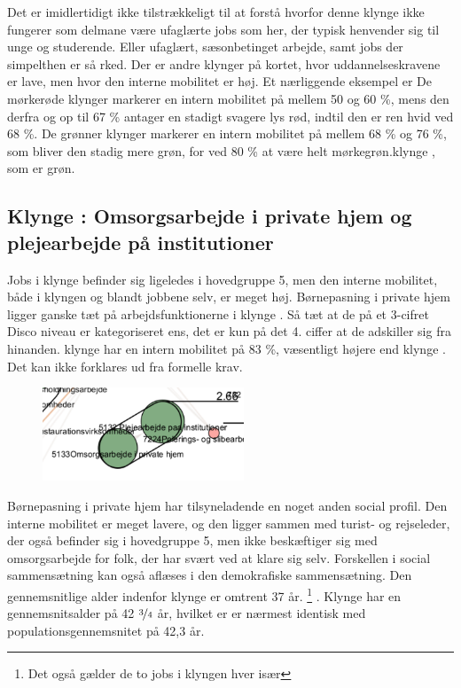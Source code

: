 Det er imidlertidigt ikke tilstrækkeligt til at forstå hvorfor denne klynge ikke fungerer som delmane være ufaglærte jobs som her, der typisk henvender sig til unge og studerende. Eller ufaglært, sæsonbetinget arbejde, samt jobs der simpelthen er så  rked. Der er andre klynger på kortet, hvor uddannelseskravene er lave, men hvor den interne mobilitet er høj. Et nærliggende eksempel er De mørkerøde klynger markerer en intern mobilitet på mellem 50 og 60 \%, mens den derfra og op til 67 \% antager en stadigt svagere lys rød, indtil den er ren hvid ved 68 \%. De grønner klynger markerer en intern mobilitet på mellem 68 \% og 76 \%, som bliver den stadig mere grøn, for ved 80 \% at være helt mørkegrøn.klynge , som er grøn. 


\subsection{Klynge : Omsorgsarbejde i private hjem og plejearbejde på institutioner}

Jobs i klynge  befinder sig ligeledes i hovedgruppe 5, men den interne mobilitet, både i klyngen og blandt jobbene selv, er meget høj. Børnepasning i private hjem ligger ganske tæt på arbejdsfunktionerne i klynge . Så tæt at de på et 3-cifret Disco niveau er kategoriseret ens, det er kun på det 4. ciffer at de adskiller sig fra hinanden. klynge  har en intern mobilitet på 83 \%, væsentligt højere end klynge . Det kan ikke forklares ud fra formelle krav. 

%
\begin{figure}
  \vspace{-20pt}
  \begin{center}
    \includegraphics[width=6cm]{fig/segzoom/seg_2_66.pdf}
   \caption{}
   \label{fig_delanalyse1_zoom_2_66}
  \end{center}
  \vspace{-20pt}
\end{figure}
%

Børnepasning i private hjem har tilsyneladende en noget anden social profil. Den interne mobilitet er meget lavere, og den ligger sammen med turist- og rejseleder, der også befinder sig i hovedgruppe 5, men ikke beskæftiger sig med omsorgsarbejde for folk, der har svært ved at klare sig selv. Forskellen i social sammensætning kan også aflæses i den demokrafiske sammensætning. Den gennemsnitlige alder indenfor klynge  er omtrent 37 år.%
%
\footnote{Det også gælder de to jobs i klyngen hver især}%
%
. Klynge  har en gennemsnitsalder på 42 $\nicefrac{3}{4}$ år, hvilket er er nærmest identisk med populationsgennemsnitet på 42,3 år. %

